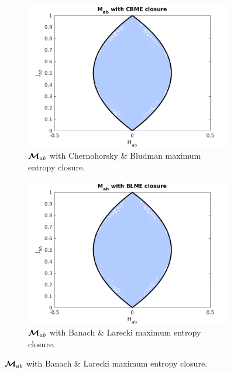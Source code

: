 \begin{figure}[h!]
\begin{subfigure}[b]{0.5\textwidth}
    \includegraphics[width=\textwidth]{figures/MabWithCBME}
    \caption{$\boldsymbol{\mathcal{M}}_{ab}$ with Chernohorsky \& Bludman maximum entropy closure.}
  \end{subfigure}
  \begin{subfigure}[b]{0.5\textwidth}
    \includegraphics[width=\textwidth]{figures/MabWithBLME}
    \caption{$\boldsymbol{\mathcal{M}}_{ab}$ with Banach \& Larecki maximum entropy closure.}
  \end{subfigure}
  \label{fig:MabWithDifferentClosure}
\end{figure}